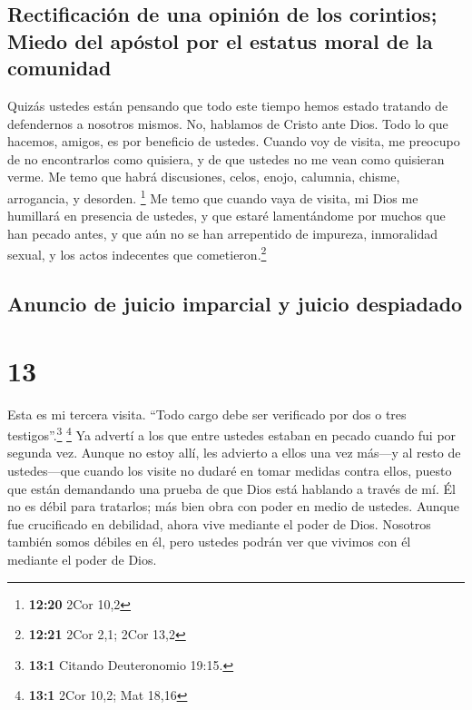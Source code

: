 \hypertarget{rectificaciuxf3n-de-una-opiniuxf3n-de-los-corintios-miedo-del-apuxf3stol-por-el-estatus-moral-de-la-comunidad}{%
\subsection{Rectificación de una opinión de los corintios; Miedo del
apóstol por el estatus moral de la
comunidad}\label{rectificaciuxf3n-de-una-opiniuxf3n-de-los-corintios-miedo-del-apuxf3stol-por-el-estatus-moral-de-la-comunidad}}

 Quizás ustedes están pensando que todo este tiempo hemos
estado tratando de defendernos a nosotros mismos. No, hablamos de Cristo
ante Dios. Todo lo que hacemos, amigos, es por beneficio de ustedes.
 Cuando voy de visita, me preocupo de no encontrarlos
como quisiera, y de que ustedes no me vean como quisieran verme. Me temo
que habrá discusiones, celos, enojo, calumnia, chisme, arrogancia, y
desorden. \footnote{\textbf{12:20} 2Cor 10,2}  Me temo
que cuando vaya de visita, mi Dios me humillará en presencia de ustedes,
y que estaré lamentándome por muchos que han pecado antes, y que aún no
se han arrepentido de impureza, inmoralidad sexual, y los actos
indecentes que cometieron.\footnote{\textbf{12:21} 2Cor 2,1; 2Cor 13,2}

\hypertarget{anuncio-de-juicio-imparcial-y-juicio-despiadado}{%
\subsection{Anuncio de juicio imparcial y juicio
despiadado}\label{anuncio-de-juicio-imparcial-y-juicio-despiadado}}

\hypertarget{section-12}{%
\section{13}\label{section-12}}

 Esta es mi tercera visita. ``Todo cargo debe ser
verificado por dos o tres testigos''.\footnote{\textbf{13:1} Citando
  Deuteronomio 19:15.} \footnote{\textbf{13:1} 2Cor 10,2; Mat 18,16}
 Ya advertí a los que entre ustedes estaban en pecado
cuando fui por segunda vez. Aunque no estoy allí, les advierto a ellos
una vez más---y al resto de ustedes---que cuando los visite no dudaré en
tomar medidas contra ellos,  puesto que están demandando
una prueba de que Dios está hablando a través de mí. Él no es débil para
tratarlos; más bien obra con poder en medio de ustedes. 
Aunque fue crucificado en debilidad, ahora vive mediante el poder de
Dios. Nosotros también somos débiles en él, pero ustedes podrán ver que
vivimos con él mediante el poder de Dios.

